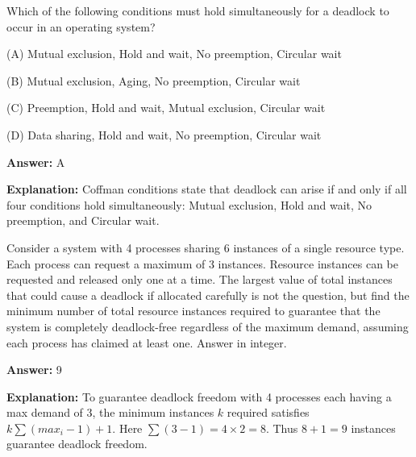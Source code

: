 \begin{tcolorbox}[enhanced,breakable,colback=boxgray,colframe=gray!45,boxrule=0.4pt,arc=2pt,left=6pt,right=6pt,top=4pt,bottom=4pt,title={Q.2},fonttitle=\bfseries\small,coltitle=black,colbacktitle=gray!15]
\small Which of the following conditions must hold simultaneously for a deadlock to occur in an operating system?\par\par\hspace*{1em}(A) Mutual exclusion, Hold and wait, No preemption, Circular wait\par\hspace*{1em}(B) Mutual exclusion, Aging, No preemption, Circular wait\par\hspace*{1em}(C) Preemption, Hold and wait, Mutual exclusion, Circular wait\par\hspace*{1em}(D) Data sharing, Hold and wait, No preemption, Circular wait\par{}\par\smallskip\textbf{Answer:} A\par\par\textbf{Explanation:} Coffman conditions state that deadlock can arise if and only if all four conditions hold simultaneously: Mutual exclusion, Hold and wait, No preemption, and Circular wait.\par
\end{tcolorbox}


\begin{tcolorbox}[enhanced,breakable,colback=boxgray,colframe=gray!45,boxrule=0.4pt,arc=2pt,left=6pt,right=6pt,top=4pt,bottom=4pt,title={Q.3},fonttitle=\bfseries\small,coltitle=black,colbacktitle=gray!15]
\small Consider a system with 4 processes sharing 6 instances of a single resource type. Each process can request a maximum of 3 instances. Resource instances can be requested and released only one at a time. The largest value of total instances that could cause a deadlock if allocated carefully is not the question, but find the minimum number of total resource instances required to guarantee that the system is completely deadlock-free regardless of the maximum demand, assuming each process has claimed at least one. Answer in integer.\par\par{}\par\smallskip\textbf{Answer:} 9\par\par\textbf{Explanation:} To guarantee deadlock freedom with 4 processes each having a max demand of 3, the minimum instances $k$ required satisfies $k \sum (max_i - 1) + 1$. Here $\sum (3 - 1) = 4 \times 2 = 8$. Thus $8 + 1 = 9$ instances guarantee deadlock freedom.\par
\end{tcolorbox}


